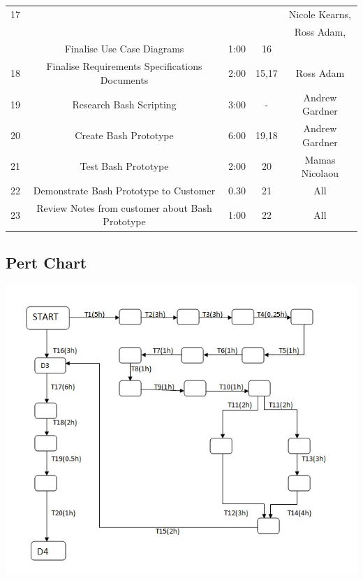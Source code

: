 \documentclass{l3deliverable}
\begin{document}
{\begin{table}
\begin{tabular}{|c |c |c |c |c |}
\hline17 &  & & & Nicole Kearns, \\
 & & & & Ross Adam, \\
 & Finalise Use Case Diagrams &1:00  &16 & \\
\hline18 & Finalise Requirements Specifications Documents & 2:00 &15,17& Ross Adam \\
\hline19 & Research Bash Scripting & 3:00 &-&Andrew Gardner\\
\hline20 & Create Bash Prototype & 6:00 &19,18&Andrew Gardner \\
\hline21 & Test Bash Prototype & 2:00 &20& Mamas Nicolaou \\
\hline22 & Demonstrate Bash Prototype to Customer & 0.30 &21& All\\     
\hline23 & Review Notes from customer about Bash Prototype & 1:00 &22& All\\      
\hline %
\end{tabular}
\label{table:nonlin} %
\end{table}
\pagebreak

\subsection{Pert Chart}
\includegraphics[scale=0.7]{img/PERT.jpg}

}
\end{document}

